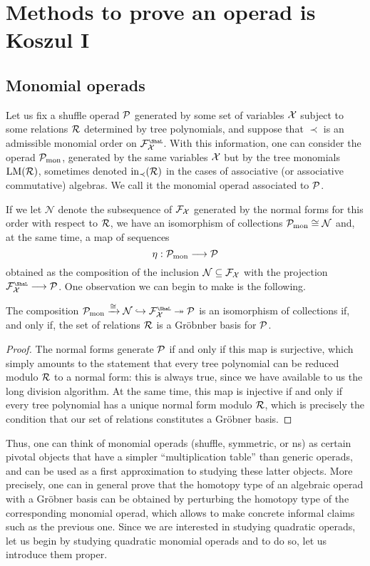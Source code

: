 
\section{Methods to prove an operad is Koszul I}\label{lecture:methods1}

 \subsection{Monomial operads}
 
Let us fix a shuffle operad ${\mathcal{P}}$ generated by some set of
variables $\mathcal{X}$ subject to some relations $\mathcal{R}$ determined
by tree polynomials, and suppose that $\prec$ is an admissible
monomial order on $\FF_\XX^\Sha$. With this information, one
can consider the operad ${\mathcal{P}}_\mathrm{mon}$, generated by
the same variables $\mathcal{X}$ but by the tree monomials 
$\operatorname{LM}(\mathcal{R})$, sometimes denoted $\mathrm{in}_\prec(\mathcal{R})$
in the cases of associative (or associative commutative) algebras.
We call it the monomial operad associated to  ${\mathcal{P}}$.

If we let $\mathcal N$ denote the subsequence of $\mathcal{F}_{\mathcal{X}}$ 
generated by the normal forms for this order with respect to $\mathcal{R}$,
we have an isomorphism of collections ${\mathcal{P}}_\mathrm{mon} \cong \mathcal N$
and, at the same time, a map of sequences
\[
\eta : {\mathcal{P}}_\mathrm{mon} \longrightarrow {\mathcal{P}} 
\]
obtained as the composition of the inclusion $\mathcal N\subseteq
\mathcal{F}_{\mathcal{X}}$ with the projection $\FF_\XX^\Sha\longrightarrow \PP$. One observation
we can begin to make is the following.

\begin{lemma} The composition $\PP_\mathrm{mon}\xrightarrow{\cong} \mathcal N \hookrightarrow 	\FF_\XX^\Sha \twoheadrightarrow \PP$
is an isomorphism of collections if, and only if, the set of relations 
$\mathcal{R}$ is a Gr\"obnber basis for ${\mathcal{P}}$. 
\end{lemma}

\begin{proof}
The normal forms generate ${\mathcal{P}}$ if and only if this map is surjective, which simply
amounts to the statement that every tree polynomial can be reduced
modulo $\mathcal{R}$ to a normal form: this is always true, since we have
available to us the long division algorithm. At the same time,
this map is injective if and only if every tree polynomial has a unique normal form
modulo $\mathcal{R}$, which is precisely the condition that our set of
relations constitutes a Gr\"obner basis.
\end{proof}

Thus, one can think of monomial operads (shuffle, symmetric, or ns) 
as certain pivotal objects that have a simpler ``multiplication table''
than generic operads, and can be used as a first approximation to studying
these latter objects. More precisely, one can in general prove that the
homotopy type of an algebraic operad with a Gr\"obner basis can be obtained
by perturbing the homotopy type of the corresponding monomial operad,
which allows to make concrete informal claims such as the previous one.
Since we are interested in studying quadratic operads, 
let us begin by studying quadratic monomial operads and to do so,
let us introduce them proper.

